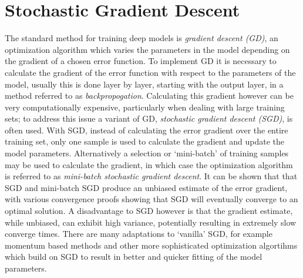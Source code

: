 \section{Stochastic Gradient Descent}
The standard method for training deep models is \textit{gradient descent (GD)}, an optimization algorithm which varies the parameters in the model depending on the gradient of a chosen error function. To implement GD it is necessary to calculate the gradient of the error function with respect to the parameters of the model, usually this is done layer by layer, starting with the output layer, in a method referred to as \textit{backpropogation}. Calculating this gradient however can be very computationally expensive, particularly when dealing with large training sets; to address this issue a variant of GD, \textit{stochastic gradient descent (SGD)}, is often used. With SGD, instead of calculating the error gradient over the entire training set, only one sample is used to calculate the gradient and update the model parameters. Alternatively a selection or `mini-batch' of training samples may be used to calculate the gradient, in which case the optimization algorithm is referred to as \textit{mini-batch stochastic gradient descent}. It can be shown that that SGD and mini-batch SGD produce an unbiased estimate of the error gradient, with various convergence proofs showing that SGD will eventually converge to an optimal solution. A disadvantage to SGD however is that the gradient estimate, while unbiased, can exhibit high variance, potentially resulting in extremely slow converge times. There are many adaptations to `vanilla' SGD, for example momentum based methods and other more sophisticated optimization algortihms which build on SGD to result in better and quicker fitting of the model parameters.

